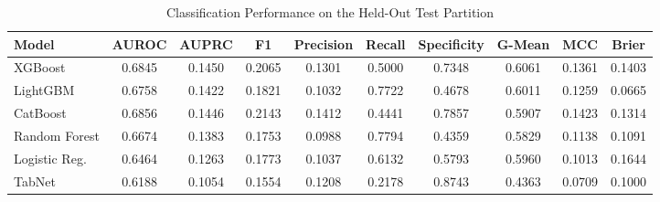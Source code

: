 \begin{table}
\centering
\caption{Classification Performance on the Held-Out Test Partition}
\label{tab:results}
\begin{tabular}{lccccccccc}
\toprule
Model & AUROC & AUPRC & F1 & Precision & Recall & Specificity & G-Mean & MCC & Brier \\
\midrule
XGBoost & 0.6845 & 0.1450 & 0.2065 & 0.1301 & 0.5000 & 0.7348 & 0.6061 & 0.1361 & 0.1403 \\
LightGBM & 0.6758 & 0.1422 & 0.1821 & 0.1032 & 0.7722 & 0.4678 & 0.6011 & 0.1259 & 0.0665 \\
CatBoost & 0.6856 & 0.1446 & 0.2143 & 0.1412 & 0.4441 & 0.7857 & 0.5907 & 0.1423 & 0.1314 \\
Random Forest & 0.6674 & 0.1383 & 0.1753 & 0.0988 & 0.7794 & 0.4359 & 0.5829 & 0.1138 & 0.1091 \\
Logistic Reg. & 0.6464 & 0.1263 & 0.1773 & 0.1037 & 0.6132 & 0.5793 & 0.5960 & 0.1013 & 0.1644 \\
TabNet & 0.6188 & 0.1054 & 0.1554 & 0.1208 & 0.2178 & 0.8743 & 0.4363 & 0.0709 & 0.1000 \\
\bottomrule
\end{tabular}
\end{table}
